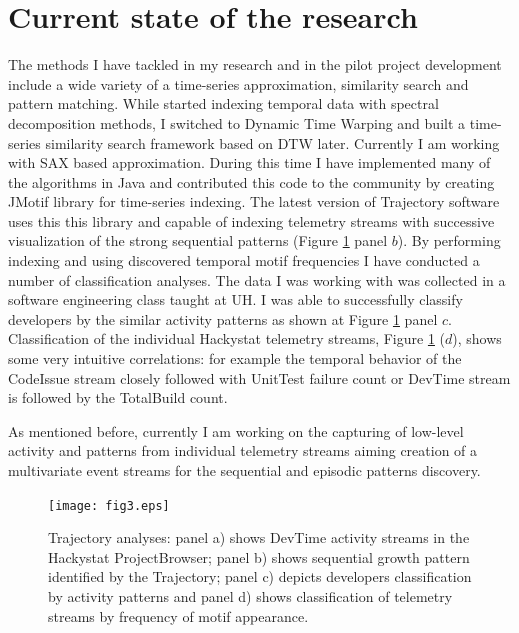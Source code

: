 \documentclass[11pt,oneside]{article}
\begin{document}
\section{Current state of the research}
The methods I have tackled in my research and in the pilot project development include a wide variety of a time-series approximation, similarity search and pattern matching. While started indexing temporal data with spectral decomposition methods, I switched to Dynamic Time Warping and built a time-series similarity search framework based on DTW later. Currently I am working with SAX based approximation. During this time I have implemented many of the algorithms in Java and contributed this code to the community by creating JMotif library for time-series indexing. The latest version of Trajectory software uses this this library and capable of indexing telemetry streams with successive visualization of the strong sequential patterns (Figure \ref{fig:fig3} panel $b$). By performing indexing and using discovered temporal motif frequencies I have conducted a number of classification analyses. The data I was working with was collected in a software engineering class taught at UH. I was able to successfully classify developers by the similar activity patterns as shown at Figure \ref{fig:fig3} panel $c$. Classification of the individual Hackystat telemetry streams, Figure \ref{fig:fig3} ($d$), shows some very intuitive correlations: for example the temporal behavior of the CodeIssue stream closely followed with UnitTest failure count or DevTime stream is followed by the TotalBuild count.

As mentioned before, currently I am working on the capturing of low-level activity and patterns from individual telemetry streams aiming creation of a multivariate event streams for the sequential and episodic patterns discovery.

\begin{figure}[tbp]
   \centering
   \texttt{[image: fig3.eps]}
   \caption{Trajectory analyses: panel a) shows DevTime activity streams in the Hackystat ProjectBrowser; panel b) shows sequential growth pattern identified by the Trajectory; panel c) depicts developers classification by activity patterns and panel d) shows classification of telemetry streams by frequency of motif appearance.}
   \label{fig:fig3}
\end{figure}
\end{document}
